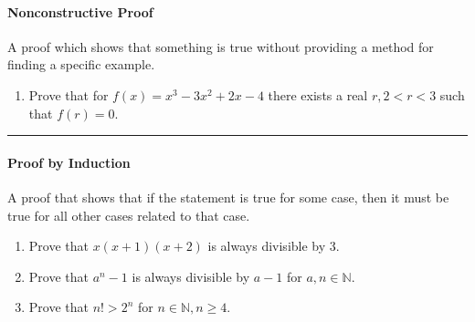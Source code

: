 	\paragraph{Nonconstructive Proof} A proof which shows that something is true without providing a method for finding a specific example.
	\begin{enumerate}
		\item Prove that for $f(x)=x^3-3x^2+2x-4$ there exists a real $r, 2<r<3$ such that $f(r)=0$. \solutionspace{2cm}
	\end{enumerate}
	\hrule
	\paragraph{Proof by Induction} A proof that shows that if the statement is true for some case, then it must be true for all other cases related to that case.
	\begin{enumerate}
		\item Prove that $x(x+1)(x+2)$ is always divisible by 3. \solutionspace{1cm}
		\item Prove that $a^n-1$ is always divisible by $a-1$ for $a,n \in \mathbb{N}$. \solutionspace{2cm}
		\item Prove that $n!>2^n$ for $n\in\mathbb{N}, n\geq4$.
	\end{enumerate}
